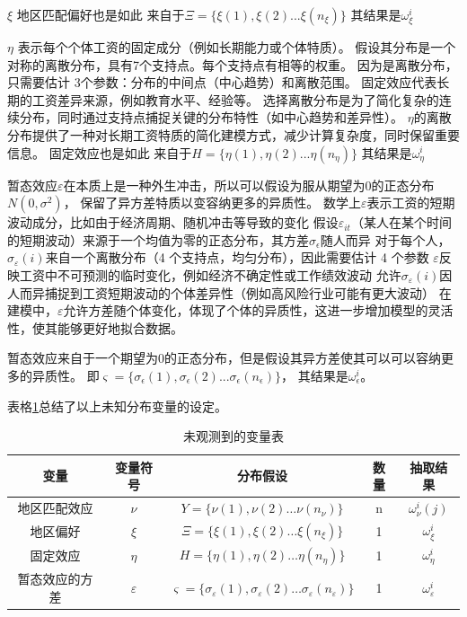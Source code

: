 \documentclass[
  a4paper,
  zihao=-4,
  fontset=mac,
  AutoFakeBold,
  AutoFakeSlant,
  oneside]{ctexbook}
\begin{document}
$\xi$
地区匹配偏好也是如此
来自于$\Xi=\{\xi(1),\xi(2)...\xi(n_{\xi})\}$
其结果是$\omega^{i}_{\xi}$

$\eta$ 表示每个个体工资的固定成分（例如长期能力或个体特质）。
假设其分布是一个对称的离散分布，具有7个支持点。每个支持点有相等的权重。
因为是离散分布，只需要估计 3个参数：分布的中间点（中心趋势）和离散范围。
固定效应代表长期的工资差异来源，例如教育水平、经验等。
选择离散分布是为了简化复杂的连续分布，同时通过支持点捕捉关键的分布特性（如中心趋势和差异性）。
$\eta$的离散分布提供了一种对长期工资特质的简化建模方式，减少计算复杂度，同时保留重要信息。
固定效应也是如此
来自于$H=\{\eta(1),\eta(2)...\eta(n_\eta)\}$
其结果是$\omega^{i}_{\eta}$

暂态效应$\varepsilon$在本质上是一种外生冲击，所以可以假设为服从期望为$0$的正态分布$N(0,\sigma^2)$，
保留了异方差特质以变容纳更多的异质性。
数学上$\varepsilon$表示工资的短期波动成分，比如由于经济周期、随机冲击等导致的变化
假设$\varepsilon_{it}$（某人在某个时间的短期波动）来源于一个均值为零的正态分布，其方差$\sigma_{\epsilon}$随人而异
对于每个人，$\sigma_\varepsilon(i)$来自一个离散分布（4 个支持点，均匀分布），因此需要估计 4 个参数
$\varepsilon$反映工资中不可预测的临时变化，例如经济不确定性或工作绩效波动
允许$\sigma_\varepsilon(i)$因人而异捕捉到工资短期波动的个体差异性（例如高风险行业可能有更大波动）
在建模中，$\varepsilon$允许方差随个体变化，体现了个体的异质性，这进一步增加模型的灵活性，使其能够更好地拟合数据。

暂态效应来自于一个期望为$0$的正态分布，但是假设其异方差使其可以可以容纳更多的异质性。
即$\varsigma=\{\sigma_{\epsilon}(1),\sigma_{\epsilon}(2)...\sigma_{\epsilon}(n_{\epsilon})\}$，
其结果是$\omega^{i}_{\epsilon}$。

表格\ref{tab:未观测到的变量表}总结了以上未知分布变量的设定。

\begin{table}[!ht]
\centering
\caption{未观测到的变量表}
\label{tab:未观测到的变量表}
\begin{tabular}{@{}ccccc@{}}
\toprule
变量 & 变量符号 & 分布假设 & 数量 & 抽取结果 \\ \midrule
地区匹配效应 & $\nu$ & $Y=\{\nu(1),\nu(2)\ldots\nu(n_{\nu})\}$ & n & $\omega^{i}_{\nu}(j)$\\
地区偏好 & $\xi$ & $\Xi=\{\xi(1),\xi(2)\ldots\xi(n_{\xi})\}$ & 1 & $\omega^{i}_{\xi}$ \\
固定效应 & $\eta$ & $H=\{\eta(1),\eta(2)\ldots\eta(n_\eta)\}$ & 1 & $\omega^{i}_{\eta}$ \\
暂态效应的方差 & $\varepsilon$ & $\varsigma=\{\sigma_{\varepsilon}(1),\sigma_{\varepsilon}(2)\ldots\sigma_{\varepsilon}(n_{\varepsilon})\}$ & 1 & $\omega^{i}_{\varepsilon}$ \\ \bottomrule
\end{tabular}
\end{table}
\end{document}
